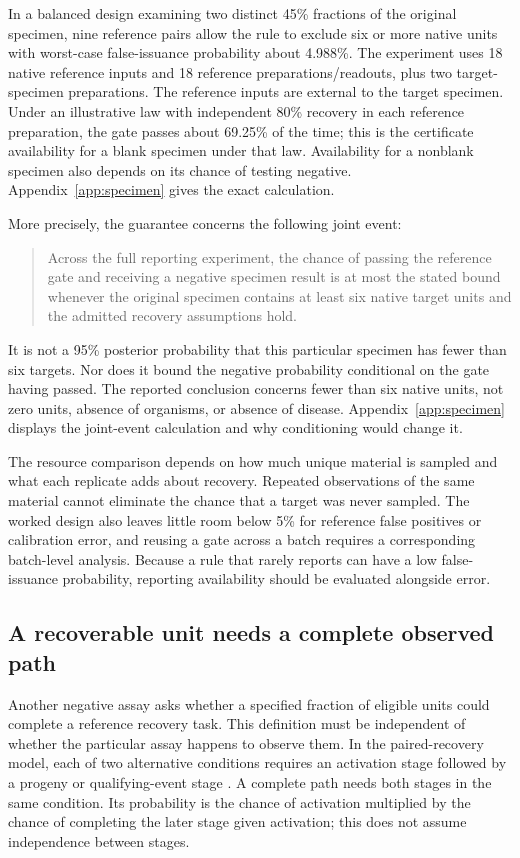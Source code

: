 \documentclass[11pt]{article}
\begin{document}
In a balanced design examining two distinct 45\% fractions of the original specimen, nine reference pairs allow the rule to exclude six or more native units with worst-case false-issuance probability about 4.988\%. The experiment uses 18 native reference inputs and 18 reference preparations/readouts, plus two target-specimen preparations. The reference inputs are external to the target specimen. Under an illustrative law with independent 80\% recovery in each reference preparation, the gate passes about 69.25\% of the time; this is the certificate availability for a blank specimen under that law. Availability for a nonblank specimen also depends on its chance of testing negative. Appendix~\ref{app:specimen} gives the exact calculation.

More precisely, the guarantee concerns the following joint event:
\begin{quote}
Across the full reporting experiment, the chance of passing the reference gate and receiving a negative specimen result is at most the stated bound whenever the original specimen contains at least six native target units and the admitted recovery assumptions hold.
\end{quote}
It is not a 95\% posterior probability that this particular specimen has fewer than six targets. Nor does it bound the negative probability conditional on the gate having passed. The reported conclusion concerns fewer than six native units, not zero units, absence of organisms, or absence of disease. Appendix~\ref{app:specimen} displays the joint-event calculation and why conditioning would change it.

The resource comparison depends on how much unique material is sampled and what each replicate adds about recovery. Repeated observations of the same material cannot eliminate the chance that a target was never sampled. The worked design also leaves little room below 5\% for reference false positives or calibration error, and reusing a gate across a batch requires a corresponding batch-level analysis. Because a rule that rarely reports can have a low false-issuance probability, reporting availability should be evaluated alongside error.

\subsection{A recoverable unit needs a complete observed path}
Another negative assay asks whether a specified fraction of eligible units could complete a reference recovery task. This definition must be independent of whether the particular assay happens to observe them. In the paired-recovery model, each of two alternative conditions requires an activation stage followed by a progeny or qualifying-event stage \citep{V}. A complete path needs both stages in the same condition. Its probability is the chance of activation multiplied by the chance of completing the later stage given activation; this does not assume independence between stages.
\end{document}
